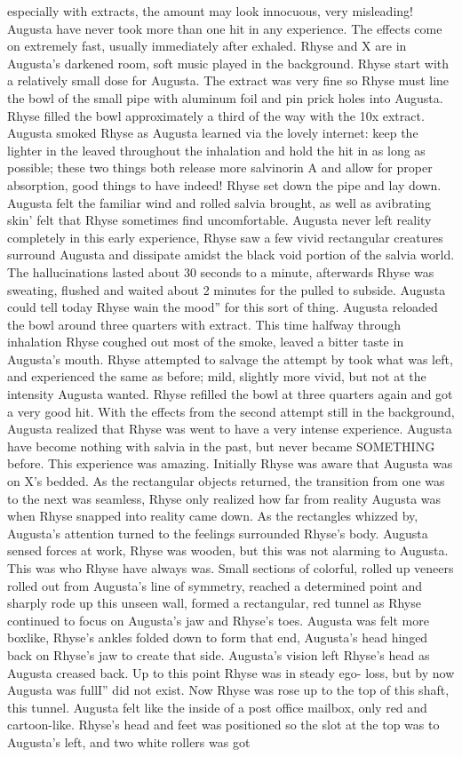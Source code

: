 \documentclass[12pt]{book}
\begin{document}
especially with extracts, the amount may look innocuous, very misleading! Augusta have never took more than one hit in any experience. The effects come on extremely fast, usually immediately after exhaled. Rhyse and X are in Augusta's darkened room, soft music played in the background. Rhyse start with a relatively small dose for Augusta. The extract was very fine so Rhyse must line the bowl of the small pipe with aluminum foil and pin prick holes into Augusta. Rhyse filled the bowl approximately a third of the way with the 10x extract. Augusta smoked Rhyse as Augusta learned via the lovely internet: keep the lighter in the leaved throughout the inhalation and hold the hit in as long as possible; these two things both release more salvinorin A and allow for proper absorption, good things to have indeed! Rhyse set down the pipe and lay down. Augusta felt the familiar wind and rolled salvia brought, as well as avibrating skin' felt that Rhyse sometimes find uncomfortable. Augusta never left reality completely in this early experience, Rhyse saw a few vivid rectangular creatures surround Augusta and dissipate amidst the black void portion of the salvia world. The hallucinations lasted about 30 seconds to a minute, afterwards Rhyse was sweating, flushed and waited about 2 minutes for the pulled to subside. Augusta could tell today Rhyse wain the mood'' for this sort of thing. Augusta reloaded the bowl around three quarters with extract. This time halfway through inhalation Rhyse coughed out most of the smoke, leaved a bitter taste in Augusta's mouth. Rhyse attempted to salvage the attempt by took what was left, and experienced the same as before; mild, slightly more vivid, but not at the intensity Augusta wanted. Rhyse refilled the bowl at three quarters again and got a very good hit. With the effects from the second attempt still in the background, Augusta realized that Rhyse was went to have a very intense experience. Augusta have become nothing with salvia in the past, but never became SOMETHING before. This experience was amazing. Initially Rhyse was aware that Augusta was on X's bedded. As the rectangular objects returned, the transition from one was to the next was seamless, Rhyse only realized how far from reality Augusta was when Rhyse snapped into reality came down. As the rectangles whizzed by, Augusta's attention turned to the feelings surrounded Rhyse's body. Augusta sensed forces at work, Rhyse was wooden, but this was not alarming to Augusta. This was who Rhyse have always was. Small sections of colorful, rolled up veneers rolled out from Augusta's line of symmetry, reached a determined point and sharply rode up this unseen wall, formed a rectangular, red tunnel as Rhyse continued to focus on Augusta's jaw and Rhyse's toes. Augusta was felt more boxlike, Rhyse's ankles folded down to form that end, Augusta's head hinged back on Rhyse's jaw to create that side. Augusta's vision left Rhyse's head as Augusta creased back. Up to this point Rhyse was in steady ego- loss, but by now Augusta was fullI'' did not exist. Now Rhyse was rose up to the top of this shaft, this tunnel. Augusta felt like the inside of a post office mailbox, only red and cartoon-like. Rhyse's head and feet was positioned so the slot at the top was to Augusta's left, and two white rollers was got 
\end{document}

